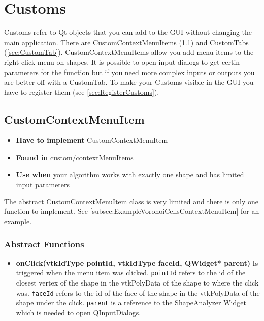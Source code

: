 
\chapter{Customs}

Customs refer to Qt objects that you can add to the GUI without changing the main application. There are CustomContextMenuItems (\ref{sec:CustomContextMenuItem}) and CustomTabs (\ref{sec:CustomTab}). CustomContextMenuItems allow you add menu items to the right click menu on shapes. It is possible to open input dialogs to get certin parameters for the function but if you need more complex inputs or outputs you are better off with a CustomTab. To make your Customs visible in the GUI you have to register them (see \ref{sec:RegisterCustoms}).

\section{CustomContextMenuItem}
\label{sec:CustomContextMenuItem}

\begin{itemize}
	\item \textbf{Have to implement} CustomContextMenuItem
	\item \textbf{Found in} custom/contextMenuItems
	\item \textbf{Use when} your algorithm works with exactly one shape and has limited input parameters
\end{itemize}

The abstract CustomContextMenuItem class is very limited and there is only one function to implement. See \ref{subsec:ExampleVoronoiCellsContextMenuItem} for an example. 

\subsection{Abstract Functions}

\begin{itemize}
	\item \textbf{onClick(vtkIdType pointId, vtkIdType faceId, QWidget* parent)} Is triggered when the menu item was clicked. \texttt{pointId} refers to the id of the closest vertex of the shape in the vtkPolyData of the shape to where the click was. \texttt{faceId} refers to the id of the face of the shape in the vtkPolyData of the shape under the click. \texttt{parent} is a reference to the ShapeAnalyzer Widget which is needed to open QInputDialogs.
\end{itemize}

